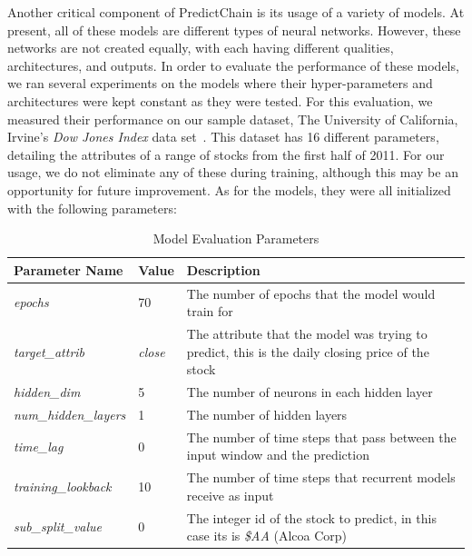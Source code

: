 \documentclass{ledger}
\begin{document}
Another critical component of PredictChain is its usage of a variety of models.  At present, all of these models
are different types of neural networks.  However, these networks are not created equally, with each having different
qualities, architectures, and outputs.  In order to evaluate the performance of these models, we ran several experiments
on the models where their hyper-parameters and architectures were kept constant as they were tested.  For this
evaluation, we measured their performance on our sample dataset, The University of California, Irvine's \textit{Dow Jones
Index} data set~\cite{dowJones}.  This dataset has 16 different parameters, detailing the attributes of a range of
stocks from the first half of 2011.  For our usage, we do not eliminate any of these during training, although this
may be an opportunity for future improvement.  As for the models, they were all initialized with the following parameters:

\begin{table}[H]
    \begin{center}
        \caption{{Model Evaluation Parameters}}
        \label{tab:evalParams}
        \bgroup
        \def\arraystretch{1.2}
        \begin{tabular}{|p{4cm}|p{1cm}|p{8cm}|}
            \hline
            \textbf{Parameter Name} & \textbf{Value} & \textbf{Description}\\
            \hline
            \textit{epochs} & 70 & The number of epochs that the model would train for\\
            \hline
            \textit{target\_attrib} & \textit{close} & The attribute that the model was trying to predict, this is the daily closing price of the stock\\
            \hline
            \textit{hidden\_dim} & 5 & The number of neurons in each hidden layer\\
            \hline
            \textit{num\_hidden\_layers} & 1 & The number of hidden layers\\
            \hline
            \textit{time\_lag} & 0 & The number of time steps that pass between the input window and the prediction\\
            \hline
            \textit{training\_lookback} & 10 & The number of time steps that recurrent models receive as input\\
            \hline
            \textit{sub\_split\_value} & 0 & The integer id of the stock to predict, in this case its is \textit{\$AA} (Alcoa Corp)\\
            \hline
        \end{tabular}
        \egroup
    \end{center}
\end{table}
\end{document}
